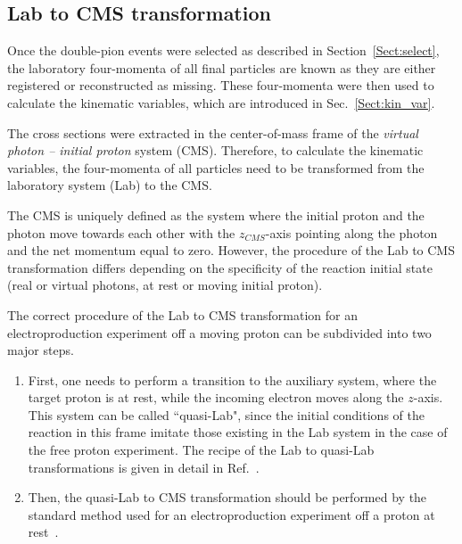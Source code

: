 \documentclass[prc,twocolumn,superscriptaddress,showpacs,amssymb,amsmath,amsfonts,aps,nofootinbib]{revtex4-1}
\begin{document}
\subsection{Lab to CMS transformation}
\label{Sect:lab_cms}

Once the double-pion events were selected as described in Section~\ref{Sect:select}, the laboratory four-momenta of all final particles are known as they are either registered or reconstructed as missing. These four-momenta were then used to calculate the kinematic variables, which are introduced in Sec.\!~\ref{Sect:kin_var}. 

The cross sections were extracted in the center-of-mass frame of the {\em virtual photon -- initial proton} system (CMS). Therefore, to calculate the kinematic variables, the four-momenta of all particles need to be transformed from the laboratory system (Lab) to the CMS.

The CMS is uniquely defined as the system where the initial proton and the photon move towards each other with the $z_{CMS}$-axis pointing along the photon and the net momentum equal to zero. However, the procedure of the Lab to CMS transformation differs depending on the specificity of the reaction initial state (real or virtual photons, at rest or moving initial proton).
 
The correct procedure of the Lab to CMS transformation for an electroproduction experiment off a moving proton can be subdivided into two major steps.

\begin{enumerate}
\item First, one needs to perform a transition to the auxiliary system, where the target proton is at rest, while the incoming electron moves along the $z$-axis. This system can be called ``quasi-Lab", since the initial conditions of the reaction in this frame imitate those existing in the Lab system in the case of the free proton experiment. The recipe of the Lab to quasi-Lab transformations is given in detail in Ref.\!~\cite{twopeg-d}.

\item Then, the quasi-Lab to CMS transformation should be performed by the standard method used for an electroproduction experiment off a proton at rest~\cite{Fed_an_note:2017,Fed_paper_2018,my_an_note:2020, my_thesis:2021}.
\end{enumerate}
\end{document}
